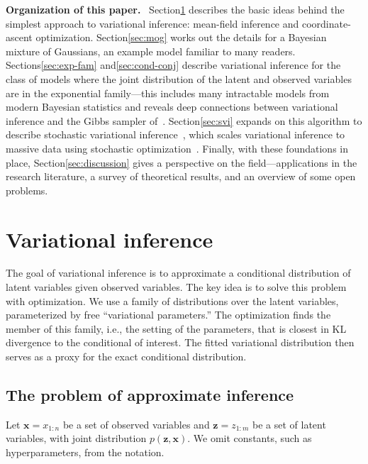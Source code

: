 \documentclass{article}
\DeclareRobustCommand{\parhead}[1]{\textbf{#1}~}
\begin{document}
\parhead{Organization of this paper.}  Section\nobreakspace \ref {sec:vi} describes the
basic ideas behind the simplest approach to variational inference:
mean-field inference and coordinate-ascent optimization.
Section\nobreakspace \ref {sec:mog} works out the details for a Bayesian mixture of
Gaussians, an example model familiar to many readers. Sections\nobreakspace \ref {sec:exp-fam} and\nobreakspace  \ref {sec:cond-conj} describe variational inference
for the class of models where the joint distribution of the latent and
observed variables are in the exponential family---this includes many
intractable models from modern Bayesian statistics and reveals deep
connections between variational inference and the Gibbs sampler
of~\citet{Gelfand:1990}.  Section\nobreakspace \ref {sec:svi} expands on this algorithm to
describe stochastic variational inference~\citep{Hoffman:2013}, which
scales variational inference to massive data using stochastic
optimization~\citep{Robbins:1951}. Finally, with these foundations in
place, Section\nobreakspace \ref {sec:discussion} gives a perspective on the
field---applications in the research literature, a survey of
theoretical results, and an overview of some open problems.
 \section{Variational inference}
\label{sec:vi}

The goal of variational inference is to approximate a conditional
distribution of latent variables given observed variables. The key
idea is to solve this problem with optimization. We use a family of
distributions over the latent variables, parameterized by free
``variational parameters.'' The optimization finds the member of this
family, i.e., the setting of the parameters, that is closest in
\gls{KL} divergence to the conditional of interest. The fitted
variational distribution then serves as a proxy for the exact
conditional distribution.

\subsection{The problem of approximate inference} \label{sec:latent-var-models}

Let ${\mathbf{x}} = x_{1:n}$ be a set of observed variables and ${\mathbf{z}} = z_{1:m}$
be a set of latent variables, with joint distribution $p({\mathbf{z}},
{\mathbf{x}})$. We omit constants, such as hyperparameters, from the notation.
\end{document}
